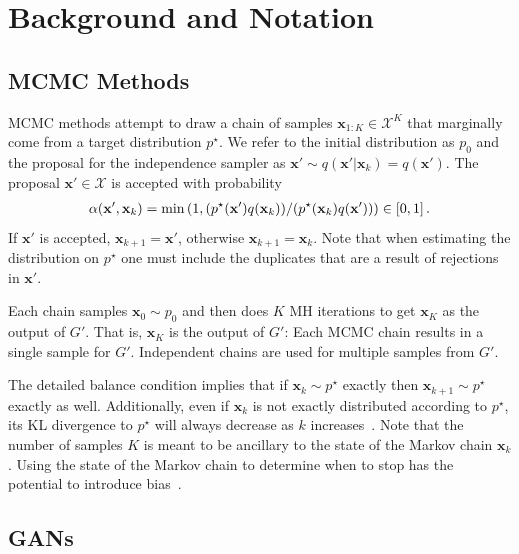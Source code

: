 \documentclass{article}
\renewcommand{\vec}[1]{{\boldsymbol{\mathbf{#1}}}} %
\newcommand{\set}[1]{\mathcal{#1}}
\newcommand{\sample}{\sim}
\newcommand{\given}{|}
\newcommand{\target}{{p^\star}}
\newcommand{\prop}{q}
\newcommand{\pinit}{{p_0}}
\newcommand{\accept}{\alpha}
\newcommand{\setx}{\set{X}}
\begin{document}
\section{Background and Notation}
\label{sec:Background}

\subsection{MCMC Methods}
\label{sec:MCMC Methods}

MCMC methods attempt to draw a chain of samples $\vec x_{1:K} \in \setx^K$ that marginally come from a target distribution $\target$.
We refer to the initial distribution as $\pinit$ and the proposal for the independence sampler as $\vec x' \sample \prop(\vec x' \given \vec x_k)=\prop(\vec x')$.
The proposal $\vec x' \in \setx$ is accepted with probability
\begin{align}
  \accept(\vec x', \vec x_k) = \min\left(1, (\target(\vec x')\prop(\vec x_k)) \middle/ (\target(\vec x_k)\prop(\vec x'))\right) \in [0,1]\,. \label{eq:alpha def}
\end{align}
If $\vec x'$ is accepted, $\vec x_{k+1} = \vec x'$, otherwise $\vec x_{k+1} = \vec x_k$.
Note that when estimating the distribution on $\target$ one must include the duplicates that are a result of rejections in $\vec x'$.

Each chain samples $\vec x_0 \sample \pinit$ and then does $K$ MH iterations to get $\vec x_K$ as the output of $G'$.
That is, $\vec x_K$ is the output of $G'$: Each MCMC chain results in a single sample for $G'$.
Independent chains are used for multiple samples from $G'$.

The detailed balance condition implies that if $\vec x_k \sample \target$ exactly then $\vec x_{k+1} \sample \target$ exactly as well.
Additionally, even if $\vec x_k$ is not exactly distributed according to $\target$, its KL divergence to $\target$ will always decrease as $k$ increases~\citep{Murray2008,Cover2012}.
Note that the number of samples $K$ is meant to be ancillary to the state of the Markov chain $\vec x_k$.
Using the state of the Markov chain to determine when to stop has the potential to introduce bias~\citep{Cowles1999}.

\subsection{GANs}
\label{sec:GANs}
\end{document}
